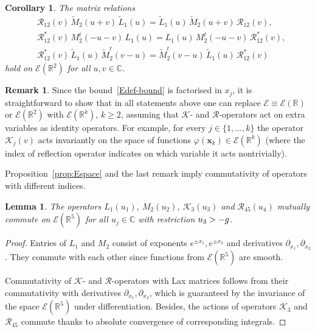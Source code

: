 \documentclass[11pt]{article}
\numberwithin{equation}{section}
\theoremstyle{plain}
\newtheorem{corollary}{Corollary}
\newtheorem{lemma}{Lemma}
\theoremstyle{definition}
\newtheorem{remark}{Remark}
\let\Im\relax
\DeclareMathOperator{\Im}{Im}
\renewcommand{\phi}{\varphi}
\begin{document}
\begin{corollary} \label{cor:RLM}
	The matrix relations
	\begin{align} \label{RtLtM}
		& \mathcal{R}_{12}(v) \, \widetilde{M}_2(u + v) \, \widetilde{L}_1(u) = \widetilde{L}_1(u) \, \widetilde{M}_2(u + v) \, \mathcal{R}_{12}(v) , \\[6pt] \label{RrLM-1}
		& \mathcal{R}^*_{12}(v) \, M_2^t(-u - v) \, L_1(u) = L_1(u) \, M_2^t(-u-v) \, \mathcal{R}^*_{12}(v), \\[6pt] \label{RrLM-2}
		& \mathcal{R}^*_{12}(v) \, \widetilde{L}_1(u) \, \widetilde{M}_2^t(v - u)  = \widetilde{M}_2^t(v - u) \, \widetilde{L}_1(u) \, \mathcal{R}^*_{12}(v)
	\end{align}
	hold on $\mathcal{E}(\mathbb{R}^2)$ for all $u, v\in \mathbb{C}$.
\end{corollary}

\begin{remark} \label{rmk: embed}
	 Since the bound~\eqref{Edef-bound} is factorised in $x_j$, it is straightforward to show that in all statements above one can replace $\mathcal{E} \equiv \mathcal{E}(\mathbb{R})$ or $\mathcal{E}(\mathbb{R}^2)$ with $\mathcal{E}(\mathbb{R}^{k})$, $k \geq 2$, assuming that $\mathcal{K}$- and $\mathcal{R}$-operators act on extra variables as identity operators. For example, for every $j \in \{1, ..., k\}$ the operator $\mathcal{K}_j(v)$ acts invariantly on the space of functions $\phi(\bm{x}_k) \in \mathcal{E}(\mathbb{R}^k)$ (where the index of reflection operator indicates on which variable it acts nontrivially). 
\end{remark}

	Proposition~\ref{prop:Espace} and the last remark imply commutativity of operators with different indices.

\begin{lemma} \label{lem:comm}
	The operators $L_1(u_1)$, $M_2(u_2)$, $\mathcal{K}_3(u_3)$ and $\mathcal{R}_{45}(u_4)$ mutually commute on $\mathcal{E}(\mathbb{R}^5)$
	for all $u_j \in \mathbb{C}$ with restriction $\Im u_3 > -g$.
\end{lemma}

\begin{proof}
	Entries of $L_1$ and $M_2$ consist of exponents $e^{\pm x_1}, e^{\pm x_2}$ and derivatives $\partial_{x_1}, \partial_{x_2}$. They commute with each other since functions from $\mathcal{E}(\mathbb{R}^5)$ are smooth.
	
	Commutativity of $\mathcal{K}$- and $\mathcal{R}$-operators with Lax matrices follows from their commutativity with derivatives $\partial_{x_1}, \partial_{x_2}$, which is guaranteed by the invariance of the space $\mathcal{E}(\mathbb{R}^5)$ under differentiation. Besides, the actions of operators $\mathcal{K}_3$ and $\mathcal{R}_{45}$ commute thanks to absolute convergence of corresponding integrals.
\end{proof}
\end{document}

